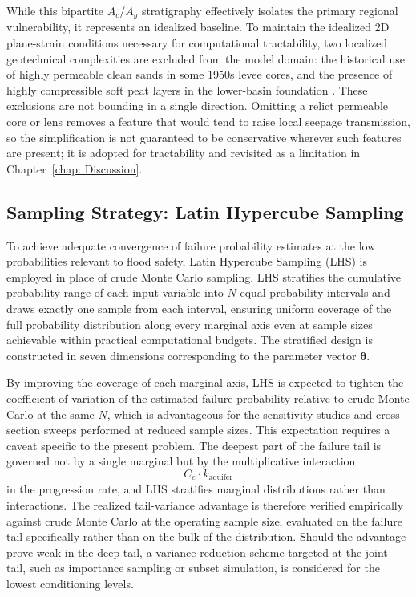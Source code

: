 While this bipartite $A_c$/$A_g$ stratigraphy effectively isolates the primary regional vulnerability, it represents an idealized baseline. To maintain the idealized 2D plane-strain conditions necessary for computational tractability, two localized geotechnical complexities are excluded from the model domain: the historical use of highly permeable clean sands in some 1950s levee cores, and the presence of highly compressible soft peat layers in the lower-basin foundation \parencite{tsai_2018}. These exclusions are not bounding in a single direction. Omitting a relict permeable core or lens removes a feature that would tend to raise local seepage transmission, so the simplification is not guaranteed to be conservative wherever such features are present; it is adopted for tractability and revisited as a limitation in Chapter~\ref{chap: Discussion}.

\subsection{Sampling Strategy: Latin Hypercube Sampling}
\label{subsec: Sampling Strategy: Latin Hypercube Sampling}

To achieve adequate convergence of failure probability estimates at the low probabilities relevant to flood safety, Latin Hypercube Sampling (LHS) is employed in place of crude Monte Carlo sampling. LHS stratifies the cumulative probability range of each input variable into $N$ equal-probability intervals and draws exactly one sample from each interval, ensuring uniform coverage of the full probability distribution along every marginal axis even at sample sizes achievable within practical computational budgets. The stratified design is constructed in seven dimensions corresponding to the parameter vector $\boldsymbol{\theta}$.

By improving the coverage of each marginal axis, LHS is expected to tighten the coefficient of variation of the estimated failure probability relative to crude Monte Carlo at the same $N$, which is advantageous for the sensitivity studies and cross-section sweeps performed at reduced sample sizes. This expectation requires a caveat specific to the present problem. The deepest part of the failure tail is governed not by a single marginal but by the multiplicative interaction
\[
C_e \cdot k_\mathrm{aquifer}
\]
in the progression rate, and LHS stratifies marginal distributions rather than interactions. The realized tail-variance advantage is therefore verified empirically against crude Monte Carlo at the operating sample size, evaluated on the failure tail specifically rather than on the bulk of the distribution. Should the advantage prove weak in the deep tail, a variance-reduction scheme targeted at the joint tail, such as importance sampling or subset simulation, is considered for the lowest conditioning levels.


